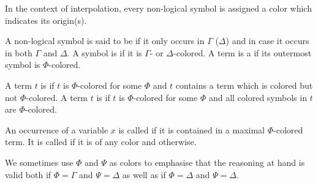 In the context of interpolation, every non-logical symbol is assigned a color which indicates its origin(s). 
\begin{defi}[Coloring]
A non-logical symbol is said to be  if it only occurs in $\Gamma$ ($\Delta$) and  in case it occurs in both $\Gamma$ and $\Delta$. A symbol is  if it is $\Gamma$- or $\Delta$-colored.
A term is a  if its outermost symbol is $\Phi$-colored.

A term $t$ is  if $t$ is $\Phi$-colored for some $\Phi$ and $t$ contains a term which is colored but not $\Phi$-colored.
A term $t$ is  if $t$ is $\Phi$-colored for some $\Phi$ and all colored symbols in $t$ are $\Phi$-colored.

  An occurrence of a variable $x$ is called  if it is contained in a maximal $\Phi$-colored term. It is called  if it is of any color and  otherwise.
\end{defi}

We sometimes use $\Phi$ and $\Psi$ as colors to emphasise that the reasoning at hand is valid both if $\Phi = \Gamma$ and $\Psi = \Delta  $ as well as if $\Phi = \Delta$ and $\Psi = \Delta$.


